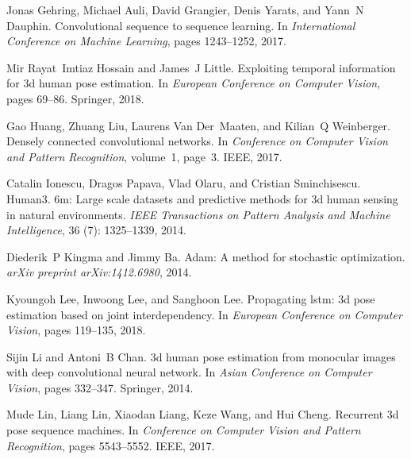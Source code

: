 \documentclass{bmvc2k}
\begin{document}
\begin{thebibliography}{42}
Jonas Gehring, Michael Auli, David Grangier, Denis Yarats, and Yann~N Dauphin.
\newblock Convolutional sequence to sequence learning.
\newblock In \emph{International Conference on Machine Learning}, pages
  1243--1252, 2017.

Mir Rayat~Imtiaz Hossain and James~J Little.
\newblock Exploiting temporal information for 3d human pose estimation.
\newblock In \emph{European Conference on Computer Vision}, pages 69--86.
  Springer, 2018.

Gao Huang, Zhuang Liu, Laurens Van Der~Maaten, and Kilian~Q Weinberger.
\newblock Densely connected convolutional networks.
\newblock In \emph{Conference on Computer Vision and Pattern Recognition},
  volume~1, page~3. IEEE, 2017.

Catalin Ionescu, Dragos Papava, Vlad Olaru, and Cristian Sminchisescu.
\newblock Human3. 6m: Large scale datasets and predictive methods for 3d human
  sensing in natural environments.
\newblock \emph{IEEE Transactions on Pattern Analysis and Machine
  Intelligence}, 36 (7): 1325--1339, 2014.

Diederik~P Kingma and Jimmy Ba.
\newblock Adam: A method for stochastic optimization.
\newblock \emph{arXiv preprint arXiv:1412.6980}, 2014.

Kyoungoh Lee, Inwoong Lee, and Sanghoon Lee.
\newblock Propagating lstm: 3d pose estimation based on joint interdependency.
\newblock In \emph{European Conference on Computer Vision}, pages 119--135,
  2018.

Sijin Li and Antoni~B Chan.
\newblock 3d human pose estimation from monocular images with deep
  convolutional neural network.
\newblock In \emph{Asian Conference on Computer Vision}, pages 332--347.
  Springer, 2014.

Mude Lin, Liang Lin, Xiaodan Liang, Keze Wang, and Hui Cheng.
\newblock Recurrent 3d pose sequence machines.
\newblock In \emph{Conference on Computer Vision and Pattern Recognition},
  pages 5543--5552. IEEE, 2017.


\end{thebibliography}
\end{document}
